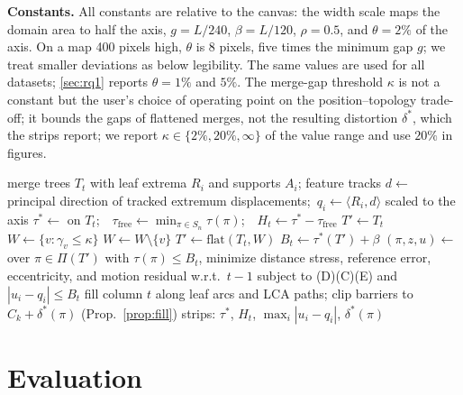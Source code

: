 \documentclass[review]{vgtc}                 %
\newcommand{\free}{\mathrm{free}}
\begin{document}
\textbf{Constants.} All constants are relative to the canvas: the width scale maps the domain area to half the axis, $g=L/240$, $\beta=L/120$, $\rho=0.5$, and $\theta=2\%$ of the axis. On a map 400 pixels high, $\theta$ is 8 pixels, five times the minimum gap $g$; we treat smaller deviations as below legibility. The same values are used for all datasets; \cref{sec:rq1} reports $\theta=1\%$ and $5\%$. The merge-gap threshold $\kappa$ is not a constant but the user's choice of operating point on the position--topology trade-off; it bounds the gaps of flattened merges, not the resulting distortion $\delta^*$, which the strips report; we report $\kappa\in\{2\%,20\%,\infty\}$ of the value range and use $20\%$ in figures.

\begin{algorithm}[t]
\caption{Certificate-driven merge tree map. Constants: $\theta=2\%$ of the axis; canvas-relative $g,\beta,\rho$; budget $\kappa$.}\label{alg:pipeline}
\begin{algorithmic}[1]
\Require merge trees $T_t$ with leaf extrema $R_i$ and supports $A_i$; feature tracks
\State $d\gets$ principal direction of tracked extremum displacements;\ $q_i\gets\langle R_i,d\rangle$ scaled to the axis
  \State $\tau^*\gets$  on $T_t$;\ \ $\tau_\free\gets\min_{\pi\in S_n}\tau(\pi)$;\ \ $H_t\gets\tau^*-\tau_\free$
  \State $T'\gets T_t$
   
    \State $W\gets\{v:\gamma_v\le\kappa\}$
        \State $W\gets W\setminus\{v\}$
      \EndIf
    \EndFor
    \State $T'\gets\mathrm{flat}(T_t,W)$
  \EndIf
  \State $B_t\gets\tau^*(T')+\beta$ 
  \State $(\pi,z,u)\gets$ over $\pi\in\Pi(T')$ with $\tau(\pi)\le B_t$, minimize distance stress, reference error, eccentricity, and motion residual w.r.t.\ $t-1$ subject to (D)(C)(E) and $|u_i-q_i|\le B_t$ 
  \State fill column $t$ along leaf arcs and LCA paths; clip barriers to $C_k+\delta^*(\pi)$ (Prop.~\ref{prop:fill})
  \State strips: $\tau^*$, $H_t$, $\max_i|u_i-q_i|$, $\delta^*(\pi)$
\EndFor
\end{algorithmic}
\end{algorithm}

\section{Evaluation}\label{sec:eval}
\end{document}
